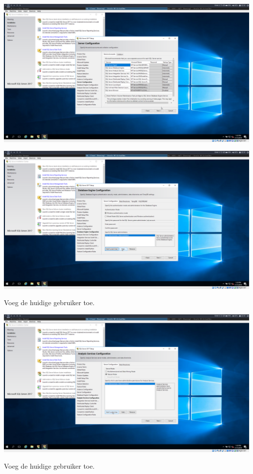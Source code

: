 \documentclass[a4paper]{article}
\begin{document}
\begin{center}
	\includegraphics[width=15cm]{Pictures/SQL/1542317574.png}
\end{center}
\begin{center}
	\includegraphics[width=15cm]{Pictures/SQL/1542317584.png}
	
	Voeg de huidige gebruiker toe.
\end{center}
\begin{center}
	\includegraphics[width=15cm]{Pictures/SQL/1542317590.png}
	
	Voeg de huidige gebruiker toe.
\end{center}
\end{document}
